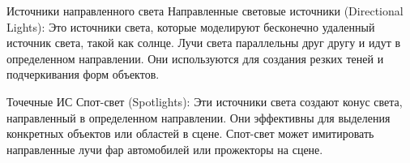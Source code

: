 \documentclass{beamer}
\begin{document}
	\begin{frame}{Источники направленного света}
		Направленные световые источники (Directional Lights): Это источники света, которые моделируют бесконечно удаленный источник света, такой как солнце. Лучи света параллельны друг другу и идут в определенном направлении. Они используются для создания резких теней и подчеркивания форм объектов.

		
	\end{frame}
	
	\begin{frame}{Точечные ИС}
		Спот-свет (Spotlights): Эти источники света создают конус света, направленный в определенном направлении. Они эффективны для выделения конкретных объектов или областей в сцене. Спот-свет может имитировать направленные лучи фар автомобилей или прожекторы на сцене.

	\end{frame}
\end{document}
